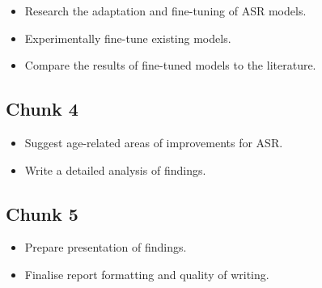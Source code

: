 \begin{itemize}
    \item Research the adaptation and fine-tuning of ASR models.
    \item Experimentally fine-tune existing models.
    \item Compare the results of fine-tuned models to the literature.
\end{itemize}

\subsection{Chunk 4}\label{subsec:wk4}

\begin{itemize}
    \item Suggest age-related areas of improvements for ASR\@.
    \item Write a detailed analysis of findings.
\end{itemize}

\subsection{Chunk 5}\label{subsec:wk5}

\begin{itemize}
    \item Prepare presentation of findings.
    \item Finalise report formatting and quality of writing.
\end{itemize}